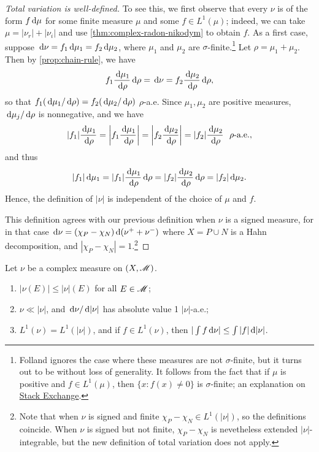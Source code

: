 \documentclass[12pt]{article} %
\begin{document}
\begin{proof}[Total variation is well-defined]
    To see this, we first observe that every $\nu$ is of the form $f \, \mathrm{d}\mu$ for some finite measure $\mu$ and some $f \in L^1(\mu)$; indeed, we can take $\mu = |\nu_r| + |\nu_i|$ and use \cref{thm:complex-radon-nikodym} to obtain $f$. As a first case, suppose $\, \mathrm{d}\nu = f_1\, \mathrm{d}\mu_1 = f_2\, \mathrm{d}\mu_2$, where $\mu_1$ and $\mu_2$ are $\sigma$-finite.\footnote{Folland ignores the case where these measures are not $\sigma$-finite, but it turns out to be without loss of generality. It follows from the fact that if $\mu$ is positive and $f \in L^1(\mu)$, then $\{x : f(x) \neq 0\}$ is $\sigma$-finite; an explanation on \href{https://math.stackexchange.com/a/3807691}{Stack Exchange}.} Let $\rho = \mu_1 + \mu_2$. Then by \cref{prop:chain-rule}, we have \[f_1 \frac{\, \mathrm{d}\mu_1}{\, \mathrm{d}\rho}\, \mathrm{d}\rho = \, \mathrm{d}\nu = f_2 \frac{\, \mathrm{d}\mu_2}{\, \mathrm{d}\rho}\, \mathrm{d}\rho,\] so that $f_1(\, \mathrm{d}\mu_1/\, \mathrm{d}\rho) = f_2(\, \mathrm{d}\mu_2/\, \mathrm{d}\rho)$ $\rho$-a.e. Since $\mu_1, \mu_2$ are positive measures, $\, \mathrm{d}\mu_j / \, \mathrm{d}\rho$ is nonnegative, and we have \[|f_1| \frac{\, \mathrm{d}\mu_1}{\, \mathrm{d}\rho} = \left|f_1 \frac{\, \mathrm{d}\mu_1}{\, \mathrm{d}\rho} \right| = \left|f_2 \frac{\, \mathrm{d}\mu_2}{\, \mathrm{d}\rho}\right| = |f_2|\frac{\, \mathrm{d}\mu_2}{\, \mathrm{d}\rho} \ \ \rho\text{-a.e.},\] and thus \[|f_1|\, \mathrm{d}\mu_1 = |f_1|\frac{\, \mathrm{d}\mu_1}{\, \mathrm{d}\rho}\, \mathrm{d}\rho = |f_2|\frac{\, \mathrm{d}\mu_2}{\, \mathrm{d}\rho}\, \mathrm{d}\rho = |f_2|\, \mathrm{d}\mu_2.\] Hence, the definition of $|\nu|$ is independent of the choice of $\mu$ and $f$. 
    
    This definition agrees with our previous definition when $\nu$ is a signed measure, for in that case $\, \mathrm{d}\nu = (\chi_P - \chi_N)\, \mathrm{d}(\nu^+ + \nu^-)$ where $X = P \cup N$ is a Hahn decomposition, and $|\chi_P - \chi_N| = 1$.\footnote{Note that when $\nu$ is signed and finite $\chi_P - \chi_N \in L^1(|\nu|)$, so the definitions coincide. When $\nu$ is signed but not finite, $\chi_P - \chi_N$ is nevetheless extended $|\nu|$-integrable, but the new definition of total variation does not apply.}
\end{proof}

\begin{proposition}
    Let $\nu$ be a complex measure on $(X, \mathscr{M})$. \begin{enumerate}
        \item $|\nu(E)| \leq |\nu|(E)$ for all $E \in \mathscr{M}$;
        \item $\nu \ll |\nu|$, and $\, \mathrm{d}\nu / \, \mathrm{d}|\nu|$ has absolute value 1 $|\nu|$-a.e.;
        \item $L^1(\nu) = L^1(|\nu|)$, and if $f \in L^1(\nu)$, then $|\int f \, \mathrm{d}\nu| \leq \int |f|\, \mathrm{d}|\nu|$.
    \end{enumerate}
\end{proposition}
\end{document}
